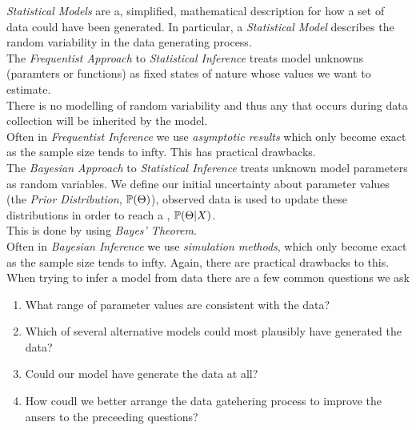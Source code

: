 \documentclass[11pt,a4paper]{article}
\begin{document}
\textit{Statistical Models} are a, simplified, mathematical description for how a set of data could have been generated. In particular, a \textit{Statistical Model} describes the random variability in the data generating process.\\

The \textit{Frequentist Approach} to \textit{Statistical Inference} treats model unknowns (paramters or functions) as fixed states of nature whose values we want to estimate.\\
There is no modelling of random variability and thus any that occurs during data collection will be inherited by the model.\\

Often in \textit{Frequentist Inference} we use \textit{asymptotic results} which only become exact as the sample size tends to infty. This has practical drawbacks.\\

The \textit{Bayesian Approach} to \textit{Statistical Inference} treats unknown model parameters as random variables. We define our initial uncertainty about parameter values (the \textit{Prior Distribution}, $\mathbb{P}(\Theta)$), observed data is used to update these distributions in order to reach a , $\mathbb{P}(\Theta|X)$.\\
\nb This is done by using \textit{Bayes' Theorem}.\\

Often in \textit{Bayesian Inference} we use \textit{simulation methods}, which only become exact as the sample size tends to infty. Again, there are practical drawbacks to this.\\

When trying to infer a model from data there are a few common questions we ask
\begin{enumerate}
	\item What range of parameter values are consistent with the data?
	\item Which of several alternative models could most plausibly have generated the data?
	\item Could our model have generate the data at all?
	\item How coudl we better arrange the data gatehering process to improve the ansers to the preceeding questions?
\end{enumerate}
\end{document}
